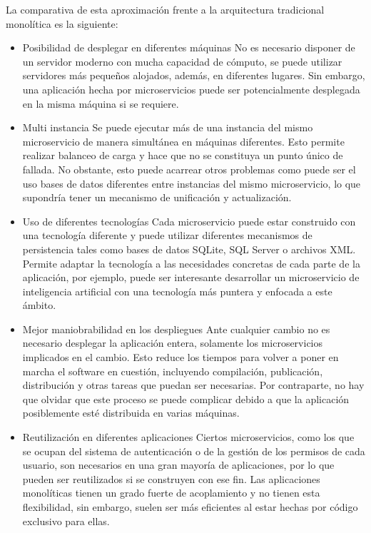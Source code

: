 \documentclass[11pt,spanish,listoffigures]{tfgetsinf}
\begin{document}
La comparativa de esta aproximación frente a la arquitectura tradicional monolítica es la siguiente:

\begin{itemize}

	\item Posibilidad de desplegar en diferentes máquinas
No es necesario disponer de un servidor moderno con mucha capacidad de cómputo, se puede utilizar servidores más pequeños alojados, además, en diferentes lugares. Sin embargo, una aplicación hecha por microservicios puede ser potencialmente desplegada en la misma máquina si se requiere.

	\item Multi instancia
Se puede ejecutar más de una instancia del mismo microservicio de manera simultánea en máquinas diferentes. Esto permite realizar balanceo de carga y hace que no se constituya un punto único de fallada. No obstante, esto puede acarrear otros problemas como puede ser el uso bases de datos diferentes entre instancias del mismo microservicio, lo que supondría tener un mecanismo de unificación y actualización.

	\item Uso de diferentes tecnologías
Cada microservicio puede estar construido con una tecnología diferente y puede utilizar diferentes mecanismos de persistencia tales como bases de datos SQLite, SQL Server o archivos XML. Permite adaptar la tecnología a las necesidades concretas de cada parte de la aplicación, por ejemplo, puede ser interesante desarrollar un microservicio de inteligencia artificial con una tecnología más puntera y enfocada a este ámbito.

	\item Mejor maniobrabilidad en los despliegues
Ante cualquier cambio no es necesario desplegar la aplicación entera, solamente los microservicios implicados en el cambio. Esto reduce los tiempos para volver a poner en marcha el software en cuestión, incluyendo compilación, publicación, distribución y otras tareas que puedan ser necesarias. Por contraparte, no hay que olvidar que este proceso se puede complicar debido a que la aplicación posiblemente esté distribuida en varias máquinas.

	\item Reutilización en diferentes aplicaciones
Ciertos microservicios, como los que se ocupan del sistema de autenticación o de la gestión de los permisos de cada usuario, son necesarios en una gran mayoría de aplicaciones, por lo que pueden ser reutilizados si se construyen con ese fin. Las aplicaciones monolíticas tienen un grado fuerte de acoplamiento y no tienen esta flexibilidad, sin embargo, suelen ser más eficientes al estar hechas por código exclusivo para ellas.


\end{itemize}
\end{document}
